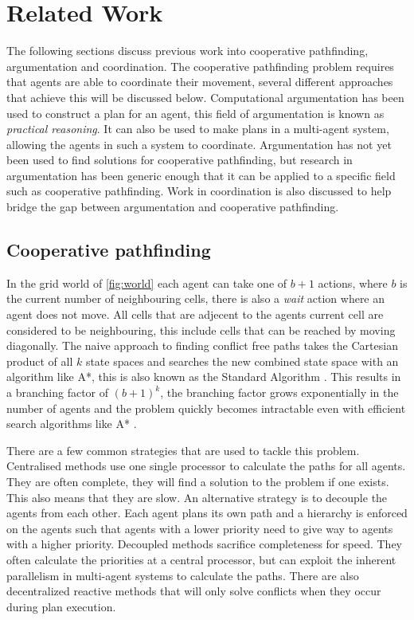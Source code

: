 \section{Related Work}\label{sec:related}
The following sections discuss previous work into cooperative pathfinding,
argumentation and coordination. The cooperative pathfinding problem requires
that agents are able to coordinate their movement, several different approaches
that achieve this will be discussed below. Computational argumentation has been
used to construct a plan for an agent, this field of argumentation is known as
\emph{practical reasoning}. It can also be used to make plans in a multi-agent
system, allowing the agents in such a system to coordinate. Argumentation has
not yet been used to find solutions for cooperative pathfinding, but research
in argumentation has been generic enough that it can be applied to a specific
field such as cooperative pathfinding. Work in coordination is also discussed
to help bridge the gap between argumentation and cooperative pathfinding.

\subsection{Cooperative pathfinding}
In the grid world of \autoref{fig:world} each agent can take one of $b+1$
actions, where $b$ is the
current number of neighbouring cells, there is also a \textit{wait} action
where an agent does not move. All cells that are adjecent to the agents current
cell are considered to be neighbouring, this include cells that can be reached
by moving diagonally. The naive approach to finding conflict free paths
takes the Cartesian product of all $k$ state spaces and searches the new
combined state space with an algorithm like A*, this is also known as the
Standard Algorithm \cite{standley2010}. This results in a branching factor of
$(b+1)^k$, the branching factor grows exponentially in the number of agents and
the problem quickly becomes intractable even with efficient search algorithms
like A* \cite{sharon2013}.

There are a few common strategies that are used to tackle this problem.
Centralised methods use one single processor to calculate the paths for all
agents. They are often complete, they will find a solution to the problem if
one exists. This also means that they are slow. An alternative strategy is to
decouple the agents from each other. Each agent plans its own path and a
hierarchy is enforced on the agents such that agents with a lower priority need
to give way to agents with a higher priority. Decoupled methods sacrifice
completeness for speed. They often calculate the priorities at a central
processor, but can exploit the inherent parallelism in multi-agent systems to
calculate the paths. There are also decentralized reactive methods that will
only solve conflicts when they occur during plan execution.

